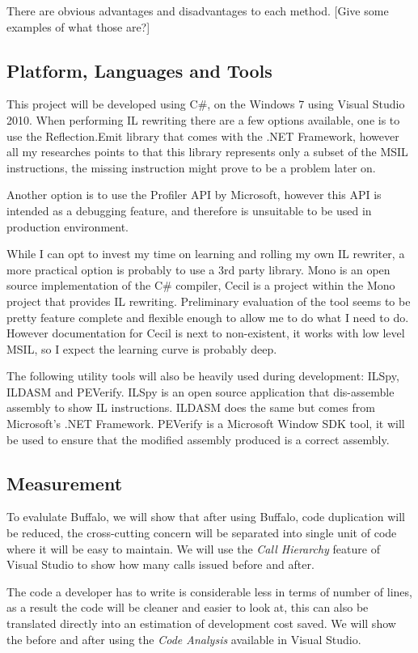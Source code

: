 There are obvious advantages and disadvantages to each method. [Give some examples of what those are?]

\subsection{Platform, Languages and Tools}
This project will be developed using C\#, on the Windows 7 using Visual Studio 2010. When performing IL rewriting there are a few options available, one is to use the Reflection.Emit library that comes with the .NET Framework, however all my researches points to that this library represents only a subset of the MSIL instructions, the missing instruction might prove to be a problem later on.

Another option is to use the Profiler API by Microsoft, however this API is intended as a debugging feature, and therefore is unsuitable to be used in production environment.

While I can opt to invest my time on learning and rolling my own IL rewriter, a more practical option is probably to use a 3rd party library. Mono is an open source implementation of the C\# compiler, Cecil is a project within the Mono project that provides IL rewriting. Preliminary evaluation of the tool seems to be pretty feature complete and flexible enough to allow me to do what I need to do. However documentation for Cecil is next to non-existent, it works with low level MSIL, so I expect the learning curve is probably deep.

The following utility tools will also be heavily used during development: ILSpy, ILDASM and PEVerify. ILSpy is an open source application that dis-assemble assembly to show IL instructions. ILDASM does the same but comes from Microsoft’s .NET Framework. PEVerify is a Microsoft Window SDK tool, it will be used to ensure that the modified assembly produced is a correct assembly.

\subsection{Measurement}
To evalulate Buffalo, we will show that after using Buffalo, code duplication will be reduced, the cross-cutting concern will be separated into single unit of code where it will be easy to maintain. We will use the {\em Call Hierarchy} feature of Visual Studio to show how many calls issued before and after. 

The code a developer has to write is considerable less in terms of number of lines, as a result the code will be cleaner and easier to look at, this can also be translated directly into an estimation of development cost saved. We will show the before and after using the {\em Code Analysis} available in Visual Studio.

